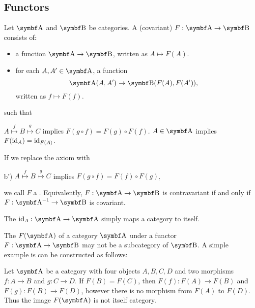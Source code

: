 \subsection{Functors}\label{subsec:functors}

\begin{definition}\label{def:functor}
  Let \( \Cat{A} \) and \( \Cat{B} \) be categories. A (covariant)  \( F: \Cat{A} \to \Cat{B} \) consists of:
  \begin{itemize}
    \item a function \( \Cat{A} \to \Cat{B} \), written as \( A \mapsto F(A) \).
    \item for each \( A, A' \in \Cat{A} \), a function
          \begin{equation*}
            \Cat{A}(A, A') \to \Bold{B}(F(A), F(A')),
          \end{equation*}
          written as \( f \mapsto F(f) \).
  \end{itemize}
  such that
  \begin{DefEnum}
     \( A \overset f \mapsto B \overset g \mapsto C \) implies \( F(g \circ f) = F(g) \circ F(f) \).
     \( A \in \Cat{A} \) implies \( F(\operatorname{id}_A) = \operatorname{id}_{F(A)} \).
  \end{DefEnum}

  If we replace the axiom  with
  \begin{DefEnum}
    \item[b')]\label{def:functor/contravariant_composition_axiom} \( A \overset f \mapsto B \overset g \mapsto C \) implies \( F(g \circ f) = F(f) \circ F(g) \),
  \end{DefEnum}
  we call \( F \) a . Equivalently, \( F: \Cat{A} \to \Cat{B} \) is contravariant if and only if \( F: \Cat{A}^{-1} \to \Cat{B} \) is covariant.

  The  \( \Id_A: \Cat{A} \to \Cat{A} \) simply maps a category to itself.
\end{definition}

\begin{remark}\label{remark:image_of_functor_maybe_not_subcategory}
  The  \( F(\Cat{A}) \) of a category \( \Cat{A} \) under a functor \( F: \Cat{A} \to \Cat{B} \) may not be a subcategory of \( \Cat{B} \). A simple example is can be constructed as follows:

  Let \( \Cat{A} \) be a category with four objects \( A, B, C, D \) and two morphisms \( f: A \to B \) and \( g: C \to D \). If \( F(B) = F(C) \), then \( F(f): F(A) \to F(B) \) and \( F(g): F(B) \to F(D) \), however there is no morphism from \( F(A) \) to \( F(D) \). Thus the image \( F(\Cat{A}) \) is not itself category.
\end{remark}

